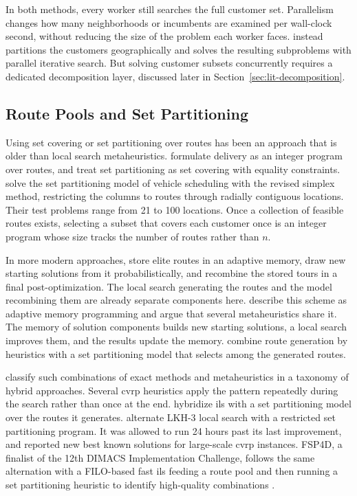 In both methods, every worker still searches the full customer set. Parallelism changes how many neighborhoods or incumbents are examined per wall-clock second, without reducing the size of the problem each worker faces. \citet{parallel_taillard_1993} instead partitions the customers geographically and solves the resulting subproblems with parallel iterative search. But solving customer subsets concurrently requires a dedicated decomposition layer, discussed later in Section~\ref{sec:lit-decomposition}.

\subsection{Route Pools and Set Partitioning}\label{sec:lit-set-covering}

Using set covering or set partitioning over routes has been an approach that is older than local search metaheuristics. \citet{balinskiIntegerProgramDelivery1964} formulate delivery as an integer program over routes, and \citet{garfinkelSetPartitioningProblemSetCovering1969} treat set partitioning as set covering with equality constraints. \citet{foster1976integer} solve the set partitioning model of vehicle scheduling with the revised simplex method, restricting the columns to routes through radially contiguous locations. Their test problems range from 21 to 100 locations. Once a collection of feasible routes exists, selecting a subset that covers each customer once is an integer program whose size tracks the number of routes rather than $n$.

In more modern approaches, \citet{rochatProbabilisticDiversificationIntensification1995} store elite routes in an adaptive memory, draw new starting solutions from it probabilistically, and recombine the stored tours in a final post-optimization. The local search generating the routes and the model recombining them are already separate components here. \citet{taillard2001adaptive} describe this scheme as adaptive memory programming and argue that several metaheuristics share it. The memory of solution components builds new starting solutions, a local search improves them, and the results update the memory. \citet{kelly1999set} combine route generation by heuristics with a set partitioning model that selects among the generated routes.

\citet{hybridizing_jourdan_2009} classify such combinations of exact methods and metaheuristics in a taxonomy of hybrid approaches. Several \gls{cvrp} heuristics apply the pattern repeatedly during the search rather than once at the end. \citet{hybrid_subramanian_2013} hybridize \gls{ils} with a set partitioning model over the routes it generates. \citet{cavaliereIntegratedLocalsearchSetpartitioning2022} alternate LKH-3 local search with a restricted set partitioning program. It was allowed to run 24 hours past its last improvement, and reported new best known solutions for large-scale \gls{cvrp} instances. FSP4D, a finalist of the 12th DIMACS Implementation Challenge, follows the same alternation with a FILO-based fast \gls{ils} feeding a route pool and then running a set partitioning heuristic to identify high-quality combinations \citep{accorsiIterativeFastOptimization2022}.

